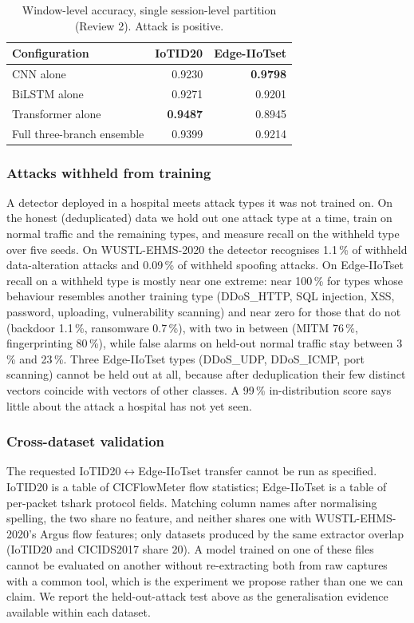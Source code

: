 \begin{table}[t]
\caption{Window-level accuracy, single session-level partition (Review 2). Attack is positive.}
\label{tab:ensemble}
\centering\footnotesize
\begin{tabular}{@{}lrr@{}}
\toprule
\textbf{Configuration} & \textbf{IoTID20} & \textbf{Edge-IIoTset} \\
\midrule
CNN alone & 0.9230 & \textbf{0.9798} \\
BiLSTM alone & 0.9271 & 0.9201 \\
Transformer alone & \textbf{0.9487} & 0.8945 \\
Full three-branch ensemble & 0.9399 & 0.9214 \\
\bottomrule
\end{tabular}
\end{table}

\subsubsection{Attacks withheld from training}
A detector deployed in a hospital meets attack types it was not trained on. On the honest (deduplicated) data we hold out one attack type at a time, train on normal traffic and the remaining types, and measure recall on the withheld type over five seeds. On WUSTL-EHMS-2020 the detector recognises 1.1\,\% of withheld data-alteration attacks and 0.09\,\% of withheld spoofing attacks. On Edge-IIoTset recall on a withheld type is mostly near one extreme: near 100\,\% for types whose behaviour resembles another training type (DDoS\_HTTP, SQL injection, XSS, password, uploading, vulnerability scanning) and near zero for those that do not (backdoor 1.1\,\%, ransomware 0.7\,\%), with two in between (MITM 76\,\%, fingerprinting 80\,\%), while false alarms on held-out normal traffic stay between 3\,\% and 23\,\%. Three Edge-IIoTset types (DDoS\_UDP, DDoS\_ICMP, port scanning) cannot be held out at all, because after deduplication their few distinct vectors coincide with vectors of other classes. A 99\,\% in-distribution score says little about the attack a hospital has not yet seen.

\subsubsection{Cross-dataset validation}
The requested IoTID20$\leftrightarrow$Edge-IIoTset transfer cannot be run as specified. IoTID20 is a table of CICFlowMeter flow statistics; Edge-IIoTset is a table of per-packet tshark protocol fields. Matching column names after normalising spelling, the two share no feature, and neither shares one with WUSTL-EHMS-2020's Argus flow features; only datasets produced by the same extractor overlap (IoTID20 and CICIDS2017 share 20). A model trained on one of these files cannot be evaluated on another without re-extracting both from raw captures with a common tool, which is the experiment we propose rather than one we can claim. We report the held-out-attack test above as the generalisation evidence available within each dataset.

